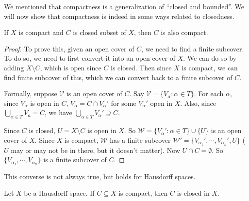 \documentclass[a4paper]{article}
\begin{document}
We mentioned that compactness is a generalization of ``closed and bounded''. We will now show that compactness is indeed in some ways related to closedness.
\begin{prop}
  If $X$ is compact and $C$ is closed subset of $X$, then $C$ is also compact.
\end{prop}
\begin{proof}
  To prove this, given an open cover of $C$, we need to find a finite subcover. To do so, we need to first convert it into an open cover of $X$. We can do so by adding $X\setminus C$, which is open since $C$ is closed. Then since $X$ is compact, we can find finite subcover of this, which we can convert back to a finite subcover of $C$.

  Formally, suppose $\mathcal{V}$ is an open cover of $C$. Say $\mathcal{V} = \{V_\alpha: \alpha \in T\}$. For each $\alpha$, since $V_\alpha$ is open in $C$, $V_\alpha = C\cap V_\alpha'$ for some $V_\alpha'$ open in $X$. Also, since $\bigcup_{\alpha \in T}V_a = C$, we have $\bigcup_{\alpha\in T}V_\alpha' \supseteq C$.

  Since $C$ is closed, $U = X \setminus C$ is open in $X$. So $\mathcal{W} = \{V_\alpha': \alpha \in T\} \cup \{U\}$ is an open cover of $X$. Since $X$ is compact, $\mathcal{W}$ has a finite subcover $\mathcal{W}' = \{V_{\alpha_1}', \cdots, V_{\alpha_n}', U\}$ ($U$ may or may not be in there, but it doesn't matter). Now $U\cap C = \emptyset$. So $\{V_{\alpha_1},\cdots, V_{\alpha_n}\}$ is a finite subcover of $C$.
\end{proof}

This converse is not always true, but holds for Hausdorff spaces.
\begin{prop}
  Let $X$ be a Hausdorff space. If $C\subseteq X$ is compact, then $C$ is closed in $X$.
\end{prop}
\end{document}
